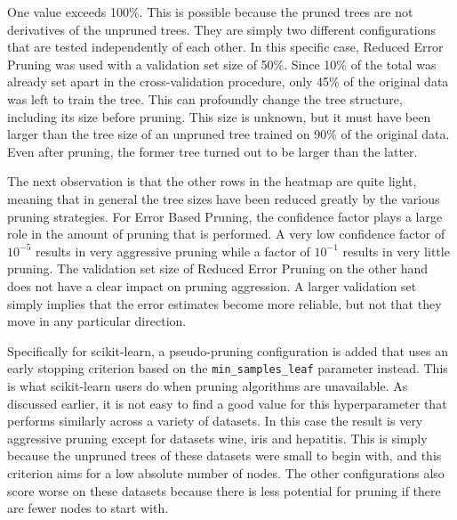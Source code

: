One value exceeds 100\%. This is possible because the pruned trees are not derivatives of the unpruned trees. They are simply two different configurations that are tested independently of each other. In this specific case, Reduced Error Pruning was used with a validation set size of 50\%. Since 10\% of the total was already set apart in the cross-validation procedure, only 45\% of the original data was left to train the tree. This can profoundly change the tree structure, including its size before pruning. This size is unknown, but it must have been larger than the tree size of an unpruned tree trained on 90\% of the original data. Even after pruning, the former tree turned out to be larger than the latter.

The next observation is that the other rows in the heatmap are quite light, meaning that in general the tree sizes have been reduced greatly by the various pruning strategies. For Error Based Pruning, the confidence factor plays a large role in the amount of pruning that is performed. A very low confidence factor of $10^{-5}$ results in very aggressive pruning while a factor of $10^{-1}$ results in very little pruning. The validation set size of Reduced Error Pruning on the other hand does not have a clear impact on pruning aggression. A larger validation set simply implies that the error estimates become more reliable, but not that they move in any particular direction.

Specifically for scikit-learn, a pseudo-pruning configuration is added that uses an early stopping criterion based on the \texttt{min\_samples\_leaf} parameter instead. This is what scikit-learn users do when pruning algorithms are unavailable. As discussed earlier, it is not easy to find a good value for this hyperparameter that performs similarly across a variety of datasets. In this case the result is very aggressive pruning except for datasets wine, iris and hepatitis. This is simply because the unpruned trees of these datasets were small to begin with, and this criterion aims for a low absolute number of nodes. The other configurations also score worse on these datasets because there is less potential for pruning if there are fewer nodes to start with.


